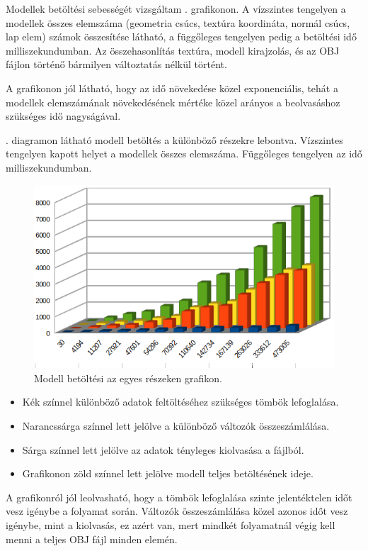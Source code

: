 Modellek betöltési sebességét vizsgáltam . grafikonon. A vízszintes tengelyen a modellek összes elemszáma (geometria csúcs, textúra koordináta, normál csúcs, lap elem) számok összesítése látható, a függőleges tengelyen pedig a betöltési idő milliszekundumban. Az összehasonlítás textúra, modell kirajzolás, és az OBJ fájlon történő bármilyen változtatás nélkül történt.

A grafikonon jól látható, hogy az idő növekedése közel exponenciális, tehát a modellek elemszámának növekedésének mértéke közel arányos a beolvasáshoz szükséges idő nagyságával.


. diagramon látható modell betöltés a különböző részekre lebontva. Vízszintes tengelyen kapott helyet a modellek összes elemszáma. Függőleges tengelyen az idő milliszekundumban.

\begin{figure}[h]
\centering
\includegraphics[width=\textwidth]{images/betoltesiido2.png}
\caption{Modell betöltési az egyes részeken grafikon.}
\label{fig:betolt2}
\end{figure}

\begin{itemize}
\item Kék színnel különböző adatok feltöltéséhez szükséges tömbök lefoglalása.
\item Narancssárga színnel lett jelölve a különböző változók összeszámlálása.
\item Sárga színnel lett jelölve az adatok tényleges kiolvasása a fájlból.
\item Grafikonon zöld színnel lett jelölve modell teljes betöltésének ideje.
 \end{itemize}
\bigskip
A grafikonról jól leolvasható, hogy a tömbök lefoglalása szinte jelentéktelen időt vesz igénybe a folyamat során. Változók összeszámlálása közel azonos időt vesz igénybe, mint a kiolvasás, ez azért van, mert mindkét folyamatnál végig kell menni a teljes OBJ fájl minden elemén.
